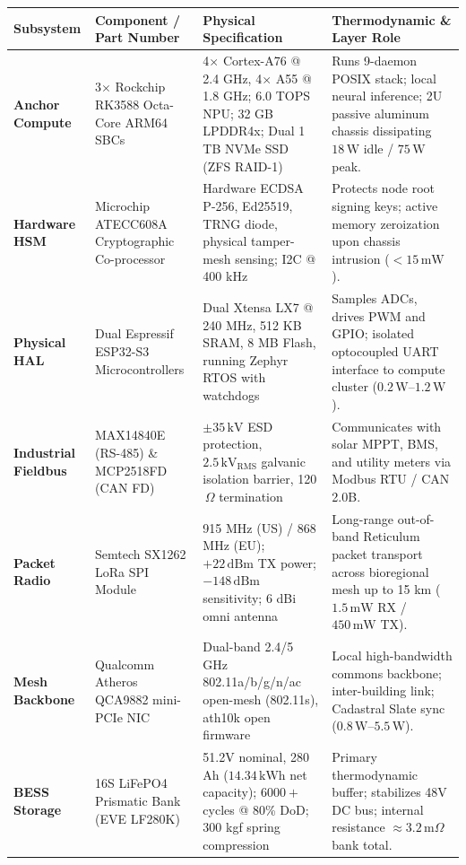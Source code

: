 \begin{table}[htbp]
\centering
\small
\setlength{\tabcolsep}{3pt}
\begin{tabular}{|p{}|p{}|p{}|p{}|}
\hline
\textbf{Subsystem} & \textbf{Component / Part Number} & \textbf{Physical Specification} & \textbf{Thermodynamic \& Layer Role} \\
\hline
\textbf{Anchor Compute} & 3$\times$ Rockchip RK3588 Octa-Core ARM64 SBCs & 4$\times$ Cortex-A76 @ 2.4 GHz, 4$\times$ A55 @ 1.8 GHz; 6.0 TOPS NPU; 32 GB LPDDR4x; Dual 1 TB NVMe SSD (ZFS RAID-1) & Runs 9-daemon POSIX stack; local neural inference; 2U passive aluminum chassis dissipating $18\,\mathrm{W}$ idle / $75\,\mathrm{W}$ peak. \\
\hline
\textbf{Hardware HSM} & Microchip ATECC608A Cryptographic Co-processor & Hardware ECDSA P-256, Ed25519, TRNG diode, physical tamper-mesh sensing; I2C @ 400 kHz & Protects node root signing keys; active memory zeroization upon chassis intrusion ($<15\,\mathrm{mW}$). \\
\hline
\textbf{Physical HAL} & Dual Espressif ESP32-S3 Microcontrollers & Dual Xtensa LX7 @ 240 MHz, 512 KB SRAM, 8 MB Flash, running Zephyr RTOS with watchdogs & Samples ADCs, drives PWM and GPIO; isolated optocoupled UART interface to compute cluster ($0.2\,\mathrm{W}$--$1.2\,\mathrm{W}$). \\
\hline
\textbf{Industrial Fieldbus} & MAX14840E (RS-485) \& MCP2518FD (CAN FD) & $\pm 35\,\mathrm{kV}$ ESD protection, $2.5\,\mathrm{kV}_{\mathrm{RMS}}$ galvanic isolation barrier, 120$\,\Omega$ termination & Communicates with solar MPPT, BMS, and utility meters via Modbus RTU / CAN 2.0B. \\
\hline
\textbf{Packet Radio} & Semtech SX1262 LoRa SPI Module & 915 MHz (US) / 868 MHz (EU); $+22\,\mathrm{dBm}$ TX power; $-148\,\mathrm{dBm}$ sensitivity; 6 dBi omni antenna & Long-range out-of-band Reticulum packet transport across bioregional mesh up to 15 km ($1.5\,\mathrm{mW}$ RX / $450\,\mathrm{mW}$ TX). \\
\hline
\textbf{Mesh Backbone} & Qualcomm Atheros QCA9882 mini-PCIe NIC & Dual-band 2.4/5 GHz 802.11a/b/g/n/ac open-mesh (802.11s), ath10k open firmware & Local high-bandwidth commons backbone; inter-building link; Cadastral Slate sync ($0.8\,\mathrm{W}$--$5.5\,\mathrm{W}$). \\
\hline
\textbf{BESS Storage} & 16S LiFePO4 Prismatic Bank (EVE LF280K) & 51.2V nominal, 280 Ah ($14.34\,\mathrm{kWh}$ net capacity); $6000+$ cycles @ 80\% DoD; 300 kgf spring compression & Primary thermodynamic buffer; stabilizes 48V DC bus; internal resistance $\approx 3.2\,\mathrm{m}\Omega$ bank total. \\

\end{tabular}
\end{table}
